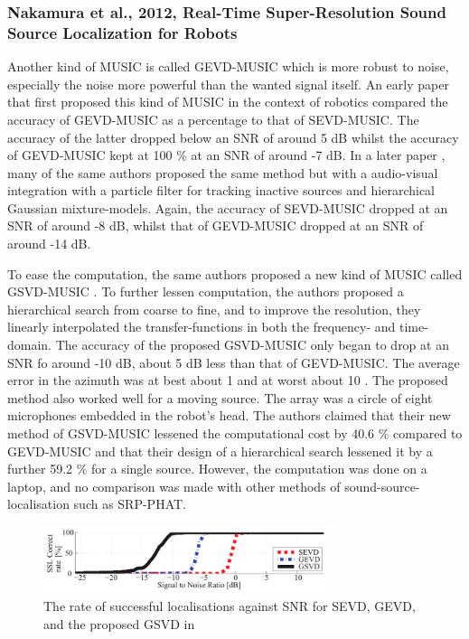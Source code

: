 \documentclass[notitlepage]{report}
\begin{document}
\subsubsection{Nakamura et al., 2012, Real-Time Super-Resolution Sound Source Localization for Robots}

Another kind of MUSIC is called GEVD-MUSIC which is more robust to noise, especially the noise more powerful than the wanted signal itself. An early paper \cite{nakamura_intelligent_2009} that first proposed this kind of MUSIC in the context of robotics compared the accuracy of GEVD-MUSIC as a percentage to that of SEVD-MUSIC. The accuracy of the latter dropped below an SNR of around 5 \si{dB} whilst the accuracy of GEVD-MUSIC kept at 100 \% at an SNR of around -7 \si{dB}. In a later paper \cite{nakamura_intelligent_2011}, many of the same authors proposed the same method but with a audio-visual integration with a particle filter for tracking inactive sources and hierarchical Gaussian mixture-models. Again, the accuracy of SEVD-MUSIC dropped at an SNR of around -8 \si{dB}, whilst that of GEVD-MUSIC dropped at an SNR of around -14 \si{dB}. 

To ease the computation, the same authors proposed a new kind of MUSIC called GSVD-MUSIC \cite{nakamura_real-time_2012}. To further lessen computation, the authors proposed a hierarchical search from coarse to fine, and to improve the resolution, they linearly interpolated the transfer-functions in both the frequency- and time-domain. The accuracy of the proposed GSVD-MUSIC only began to drop at an SNR fo around -10 \si{dB}, about 5 \si{dB} less than that of GEVD-MUSIC. The average error in the azimuth was at best about 1 \si{\deg} and at worst about 10 \si{\deg}. The proposed method also worked well for a moving source. The array was a circle of eight microphones embedded in the robot's head. The authors claimed that their new method of GSVD-MUSIC lessened the computational cost by 40.6 \% compared to GEVD-MUSIC and that their design of a hierarchical search lessened it by a further 59.2 \% for a single source. However, the computation was done on a laptop, and no comparison was made with other methods of sound-source-localisation such as SRP-PHAT.

\begin{figure}[H]
\includegraphics[width=0.75\textwidth]{./nakamura_2012/rate_SNR.png}
\centering
\caption{The rate of successful localisations against SNR for SEVD, GEVD, and the proposed GSVD in \cite{nakamura_real-time_2012}}
\label{fig:nakamura_2012_rate_SNR}
\centering
\end{figure}
\end{document}
